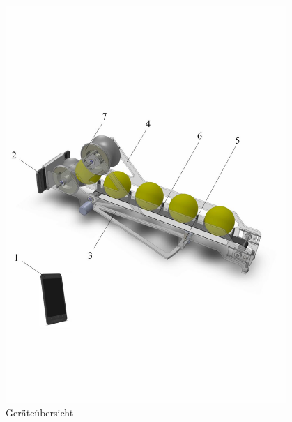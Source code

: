 \begin{figure}[h!]
		\centering
		\includegraphics[width=0.95\textwidth,clip,trim=1mm 18mm 5mm 24mm]
		{Enddokumentation/Loesungskonzept/Bilder/Beschreibung_Komponenten-edited.jpg}
		\caption{Geräteübersicht}
		\label{fig:Geraeteuebersicht}
\end{figure}
\newpage
